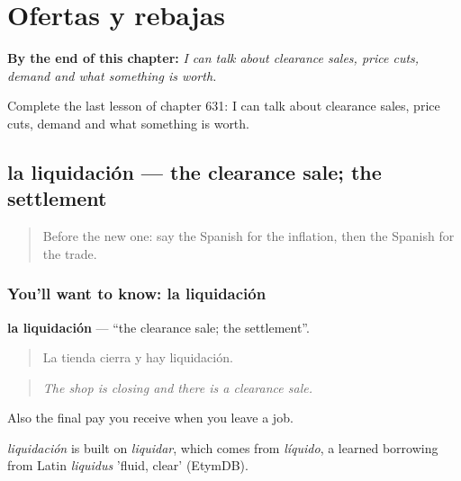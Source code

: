 
\chapter{Ofertas y rebajas}
\label{ch:es-ofertas-y-rebajas}

\begin{chapteropening}
\textbf{By the end of this chapter:} \emph{I can talk about clearance sales, price cuts, demand and what something is worth.}

Complete the last lesson of chapter 631: I can talk about clearance sales, price cuts, demand and what something is worth.
\end{chapteropening}

\section[la liquidación]{la liquidación — the clearance sale; the settlement}

\label{lesson:ES-C631-liquidacion}



\begin{quote}
Before the new one: say the Spanish for the inflation, then the Spanish for the trade.
\end{quote}

\subsection*{You'll want to know: la liquidación}
\textbf{la liquidación} — \textquotedblleft{}the clearance sale; the settlement\textquotedblright{}.

\begin{quote}
La tienda cierra y hay liquidación.
\end{quote}

\begin{quote}
\emph{The shop is closing and there is a clearance sale.}
\end{quote}

Also the final pay you receive when you leave a job.

\begin{cousinweb}
\emph{liquidación} is built on \emph{liquidar}, which comes from \emph{líquido}, a learned borrowing from Latin \emph{liquidus} 'fluid, clear' (EtymDB).
\end{cousinweb}

